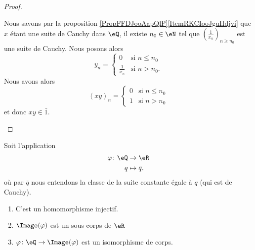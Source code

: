 \begin{proof}
\begin{subproof}
        Nous savons par la proposition \ref{PropFFDJooAapQlP}\ref{ItemRKCIooJguHdjvi} que \( x\) étant une suite de Cauchy dans \( \eQ\), il existe \( n_0\in \eN\) tel que \( \left( \frac{1}{ x_n } \right)_{n\geq n_0}\) est une suite de Cauchy. Nous posons alors
        \begin{equation}
            y_n=\begin{cases}
                0    &   \text{si } n\leq n_0\\
                \frac{1}{ x_n }    &    \text{si } n>n_0.
            \end{cases}
        \end{equation}
        Nous avons alors
        \begin{equation}
            (xy)_n=\begin{cases}
                0    &   \text{si } n\leq n_0\\
                1    &    \text{si } n>n_0
            \end{cases}
        \end{equation}
        et donc \( xy\in\bar 1\).
    \end{subproof}
\end{proof}

\begin{proposition}     \label{PropooEPFCooMtDOfP}
    Soit l'application
    \begin{equation}
        \begin{aligned}
            \varphi\colon \eQ&\to \eR \\
            q&\mapsto \bar q .
        \end{aligned}
    \end{equation}
    où par \( \bar q\) nous entendons la classe de la suite constante égale à \( q\) (qui est de Cauchy).
    \begin{enumerate}
        \item
            C'est un homomorphisme injectif.
        \item
            \( \Image(\varphi)\) est un sous-corps de \( \eR\)
        \item
            \( \varphi\colon \eQ\to \Image(\varphi)\) est un isomorphisme de corps.
    \end{enumerate}
\end{proposition}

